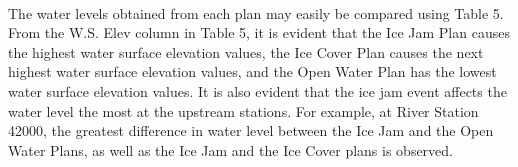 \documentclass[]{article}
\begin{document}
\paragraph{}
The water levels obtained from each plan may easily be compared using Table 5. From the W.S. Elev column in Table 5, it is evident that the Ice Jam Plan causes the highest water surface elevation values, the Ice Cover Plan causes the next highest water surface elevation values, and the Open Water Plan has the lowest water surface elevation values. It is also evident that the ice jam event affects the water level the most at the upstream stations. For example, at River Station 42000, the greatest difference in water level between the Ice Jam and the Open Water Plans, as well as the Ice Jam and the Ice Cover plans is observed. 
\end{document}
